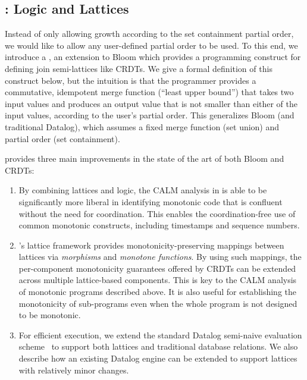 
\subsection{\lang: Logic and Lattices}
Instead of only allowing growth according to the set containment
partial order, we would like to allow any user-defined partial order to be used.  
To this end, we introduce a \lang, an extension to Bloom which provides a programming construct for defining join semi-lattices like CRDTs.
We give a
formal definition of this construct below, but the intuition is that the programmer provides a commutative, idempotent merge function (``least upper bound'')
that takes two input values and produces an output value that is not smaller
than either of the input values, according to the user's partial order. This
generalizes Bloom (and traditional Datalog), which assumes a fixed merge
function (set union) and partial order (set containment).

\lang provides three main improvements in the state of the art of both Bloom and CRDTs:  
\begin{enumerate}
\item By combining lattices and logic, the CALM analysis in \lang is able to be
  significantly more liberal in identifying monotonic code that is confluent
  without the need for coordination.  This enables the coordination-free use of
  common monotonic constructs, including timestamps and sequence numbers.
\item {\lang}'s lattice framework provides monotonicity-preserving mappings
  between lattices via \emph{morphisms} and \emph{monotone functions}.  By using such mappings, the per-component monotonicity guarantees offered by CRDTs can be extended across multiple lattice-based components.  This is key to the CALM analysis of monotonic \lang programs described above.  It is also useful for establishing the monotonicity of sub-programs even when the whole program is not designed to be monotonic.
\item For efficient execution, we extend the standard Datalog semi-naive
  evaluation scheme~\cite{Balbin1987} to support both lattices and traditional
  database relations. We also describe how an existing Datalog engine can be
  extended to support lattices with relatively minor changes.
\end{enumerate}

